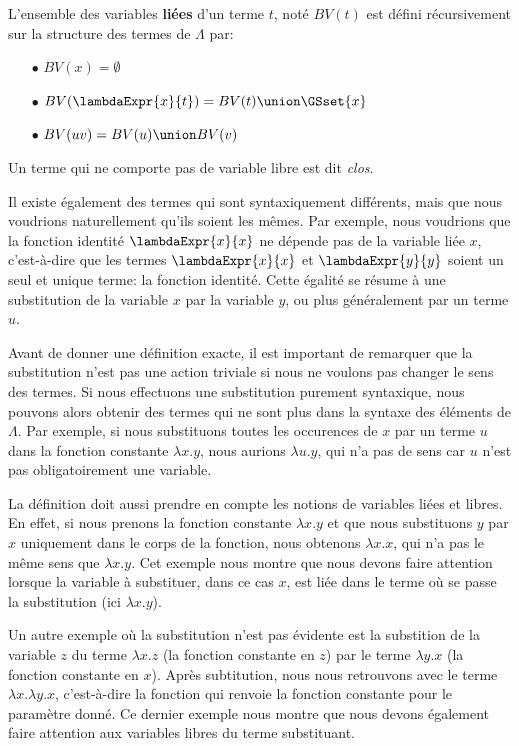 \begin{definition} 
  L'ensemble des variables \textbf{liées} d'un terme $t$, noté $BV(t)$ est défini
  récursivement sur la structure des termes de $\Lambda$ par:
  \begin{itemize}
  \item[$\bullet$] $BV(x) = \emptyset$
  \item[$\bullet$] $BV(\lambdaExpr{x}{t}) = BV(t) \union \GSset{x}$
  \item[$\bullet$] $BV(u v) = BV(u) \union BV(v)$
  \end{itemize}
\end{definition}

Un terme qui ne comporte pas de variable libre est dit \textit{clos}.

Il existe également des termes qui sont syntaxiquement différents, mais que nous
voudrions naturellement qu'ils soient les mêmes. Par exemple, nous voudrions que
la fonction identité $\lambdaExpr{x}{x}$ ne dépende pas de la variable liée $x$,
c'est-à-dire que les termes $\lambdaExpr{x}{x}$ et $\lambdaExpr{y}{y}$ soient un seul et
unique terme: la fonction identité. Cette égalité se résume à une substitution
de la variable $x$ par la variable $y$, ou plus généralement par un terme $u$.

Avant de donner une définition exacte, il est important de remarquer que la
substitution n'est pas une action triviale si nous ne voulons pas changer le
sens des termes. Si nous effectuons une
substitution purement syntaxique, nous pouvons alors obtenir des termes qui ne sont
plus dans la syntaxe des éléments de $\Lambda$. Par exemple, si nous
substituons toutes les occurences de $x$ par un terme $u$ dans la fonction constante
$\lambda x . y$, nous aurions $\lambda u . y$, qui n'a pas de sens car $u$ n'est
pas obligatoirement une variable.

La définition doit aussi prendre en compte les notions de variables liées et libres. En effet, si nous
prenons la fonction constante $\lambda x . y$ et que nous substituons $y$ par 
$x$ uniquement dans le corps de la fonction, nous obtenons $\lambda x . x$, qui
n'a pas le même sens que $\lambda x . y$. Cet exemple nous montre que nous
devons faire attention lorsque la variable à substituer, dans ce cas $x$, est
liée dans le terme où se passe la substitution (ici $\lambda x . y$).

Un autre exemple où la substitution n'est pas évidente est la substition de la
variable $z$ du terme $\lambda x . z$ (la fonction constante en $z$) par le terme
$\lambda y . x$ (la fonction constante en $x$). Après subtitution, nous nous
retrouvons avec le terme $\lambda x . \lambda y . x$, c'est-à-dire la fonction
qui renvoie la fonction constante pour le paramètre donné. Ce dernier exemple
nous montre que nous devons également faire attention aux variables libres du
terme substituant.

